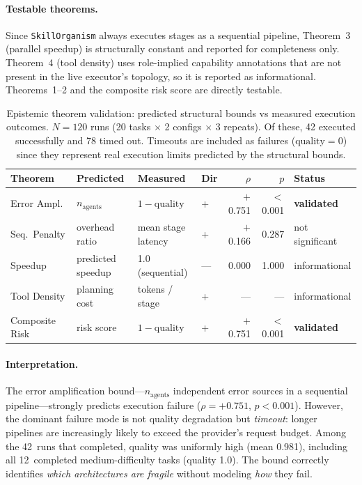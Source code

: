\paragraph{Testable theorems.}
Since \texttt{SkillOrganism} always executes stages as a sequential
pipeline, Theorem~3 (parallel speedup) is structurally constant and
reported for completeness only.  Theorem~4 (tool density) uses
role-implied capability annotations that are not present in the live
executor's topology, so it is reported as informational.  Theorems~1--2
and the composite risk score are directly testable.

\begin{table}[h]
\caption{Epistemic theorem validation: predicted structural bounds vs
measured execution outcomes.  $N = 120$ runs (20 tasks $\times$ 2
configs $\times$ 3 repeats).  Of these, 42 executed successfully and
78 timed out.  Timeouts are
included as failures ($\text{quality} = 0$) since they represent real
execution limits predicted by the structural bounds.}
\label{tab:topology-validation}
\centering
\small
\begin{tabular}{llll rrl}
\toprule
Theorem & Predicted & Measured & Dir & $\rho$ & $p$ & Status \\
\midrule
Error Ampl. & $n_\text{agents}$ & $1 - \text{quality}$ & + &
  $+$0.751 & $<$0.001 & \textbf{validated} \\
Seq.\ Penalty & overhead ratio & mean stage latency & + &
  $+$0.166 & 0.287 & not significant \\
Speedup & predicted speedup & 1.0 (sequential) & --- &
  0.000 & 1.000 & informational \\
Tool Density & planning cost & tokens / stage & + &
  --- & --- & informational \\
Composite Risk & risk score & $1 - \text{quality}$ & + &
  $+$0.751 & $<$0.001 & \textbf{validated} \\
\bottomrule
\end{tabular}
\end{table}

\paragraph{Interpretation.}
The error amplification bound---$n_\text{agents}$ independent error
sources in a sequential pipeline---strongly predicts execution failure
($\rho = +0.751$, $p < 0.001$).  However, the dominant failure mode is
not quality degradation but \emph{timeout}: longer pipelines are
increasingly likely to exceed the provider's request budget.
Among the 42~runs that completed, quality was uniformly high (mean
0.981), including all 12~completed medium-difficulty tasks (quality
1.0).  The bound correctly identifies \emph{which architectures are
fragile} without modeling \emph{how} they fail.

